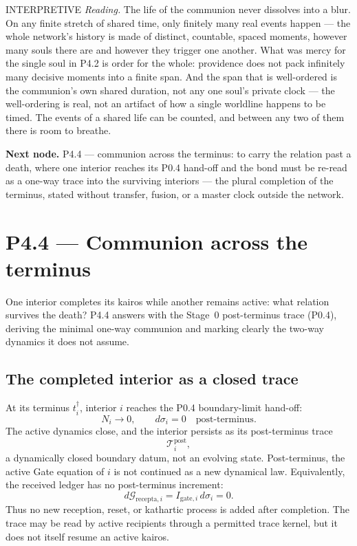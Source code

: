 \documentclass[11pt,a4paper]{article}
\newcommand{\stInterp}{\textcolor{cInt}{\textsf{\small INTERPRETIVE}}}
\theoremstyle{definition}
\theoremstyle{plain}
\theoremstyle{remark}
\begin{document}
\medskip
\stInterp\quad
\emph{Reading.}
The life of the communion never dissolves into a blur. On any finite stretch of shared time,
only finitely many real events happen --- the whole network's history is made of distinct,
countable, spaced moments, however many souls there are and however they trigger one another.
What was mercy for the single soul in P4.2 is order for the whole: providence does not pack
infinitely many decisive moments into a finite span. And the span that is well-ordered is the
communion's own shared duration, not any one soul's private clock --- the well-ordering is
real, not an artifact of how a single worldline happens to be timed. The events of a shared
life can be counted, and between any two of them there is room to breathe.

\medskip
\textbf{Next node.} P4.4 --- communion across the terminus: to carry the relation past a
death, where one interior reaches its P0.4 hand-off and the bond must be re-read as a
one-way trace into the surviving interiors --- the plural completion of the terminus, stated
without transfer, fusion, or a master clock outside the network.

\section{P4.4 --- Communion across the terminus}

One interior completes its kairos while another remains active: what relation survives the
death? P4.4 answers with the Stage~0 post-terminus trace (P0.4), deriving the minimal
one-way communion and marking clearly the two-way dynamics it does not assume.

\subsection{The completed interior as a closed trace}

At its terminus \(t_i^\dagger\), interior \(i\) reaches the P0.4 boundary-limit
hand-off:
\[
N_i\to0,
\qquad
d\sigma_i=0
\quad
\text{post-terminus}.
\]
The active dynamics close, and the interior persists as its post-terminus trace
\[
\mathcal T_i^{\mathrm{post}},
\]
a dynamically closed boundary datum, not an evolving state.
Post-terminus, the active Gate equation of \(i\) is not continued as a new
dynamical law. Equivalently, the received ledger has no post-terminus increment:
\[
d\mathcal G_{\mathrm{recepta},i}
=
I_{\mathrm{gate},i}\,d\sigma_i
=
0.
\]
Thus no new reception, reset, or kathartic process is added after completion. The
trace may be read by active recipients through a permitted trace kernel, but it
does not itself resume an active kairos.
\end{document}

